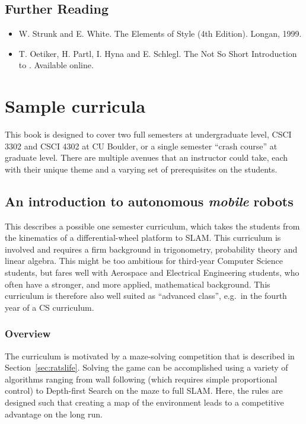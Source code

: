 \documentclass[paper=6.14in:9.21in,pagesize=pdftex,11pt,twoside,openright]{scrbook}
\begin{document}
\section*{Further Reading}

\begin{itemize}
\item W. Strunk and E. White. The Elements of Style (4th Edition). Longan, 1999.
\item T. Oetiker, H. Partl, I. Hyna and E. Schlegl. The Not So Short Introduction to \LaTeXe. Available online.
\end{itemize}

\chapter{Sample curricula}

This book is designed to cover two full semesters at undergraduate level, CSCI 3302 and CSCI 4302 at CU Boulder, or a single semester ``crash course'' at graduate level. There are multiple avenues that an instructor could take, each with their unique theme and a varying set of prerequisites on the students.


\section{An introduction to autonomous \emph{mobile} robots}
This describes a possible one semester curriculum, which takes the students from the kinematics of a differential-wheel platform to SLAM. This curriculum is involved and requires a firm background in trigonometry, probability theory and linear algebra. This might be too ambitious for third-year Computer Science students, but fares well with Aerospace and Electrical Engineering students, who often have a stronger, and more applied, mathematical background. This curriculum is therefore also well suited as ``advanced class'', e.g.\ in the fourth year of a CS curriculum.

\subsection{Overview}
The curriculum is motivated by a maze-solving competition that is described in Section~\ref{sec:ratslife}. Solving the game can be accomplished using a variety of algorithms ranging from wall following (which requires simple proportional control) to Depth-first Search on the maze to full SLAM. Here, the rules are designed such that creating a map of the environment leads to a competitive advantage on the long run.
\end{document}
